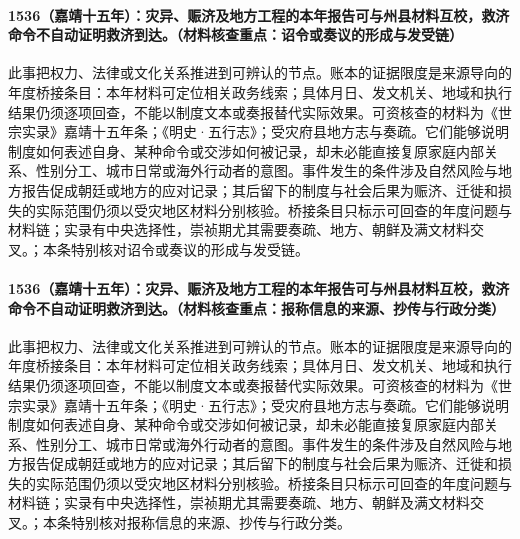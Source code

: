 \paragraph{1536（嘉靖十五年）：灾异、赈济及地方工程的本年报告可与州县材料互校，救济命令不自动证明救济到达。（材料核查重点：诏令或奏议的形成与发受链）} 此事把权力、法律或文化关系推进到可辨认的节点。账本的证据限度是来源导向的年度桥接条目：本年材料可定位相关政务线索；具体月日、发文机关、地域和执行结果仍须逐项回查，不能以制度文本或奏报替代实际效果。可资核查的材料为《世宗实录》嘉靖十五年条；《明史·五行志》；受灾府县地方志与奏疏。它们能够说明制度如何表述自身、某种命令或交涉如何被记录，却未必能直接复原家庭内部关系、性别分工、城市日常或海外行动者的意图。事件发生的条件涉及自然风险与地方报告促成朝廷或地方的应对记录；其后留下的制度与社会后果为赈济、迁徙和损失的实际范围仍须以受灾地区材料分别核验。桥接条目只标示可回查的年度问题与材料链；实录有中央选择性，崇祯期尤其需要奏疏、地方、朝鲜及满文材料交叉。；本条特别核对诏令或奏议的形成与发受链。

\paragraph{1536（嘉靖十五年）：灾异、赈济及地方工程的本年报告可与州县材料互校，救济命令不自动证明救济到达。（材料核查重点：报称信息的来源、抄传与行政分类）} 此事把权力、法律或文化关系推进到可辨认的节点。账本的证据限度是来源导向的年度桥接条目：本年材料可定位相关政务线索；具体月日、发文机关、地域和执行结果仍须逐项回查，不能以制度文本或奏报替代实际效果。可资核查的材料为《世宗实录》嘉靖十五年条；《明史·五行志》；受灾府县地方志与奏疏。它们能够说明制度如何表述自身、某种命令或交涉如何被记录，却未必能直接复原家庭内部关系、性别分工、城市日常或海外行动者的意图。事件发生的条件涉及自然风险与地方报告促成朝廷或地方的应对记录；其后留下的制度与社会后果为赈济、迁徙和损失的实际范围仍须以受灾地区材料分别核验。桥接条目只标示可回查的年度问题与材料链；实录有中央选择性，崇祯期尤其需要奏疏、地方、朝鲜及满文材料交叉。；本条特别核对报称信息的来源、抄传与行政分类。

